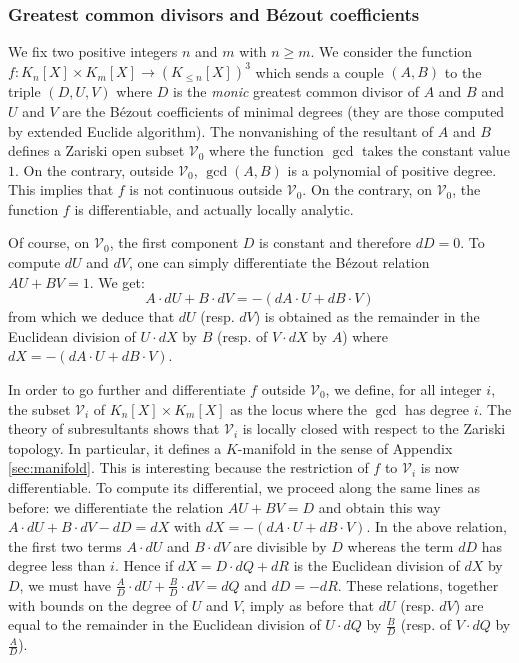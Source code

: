 \documentclass{lms}
\begin{document}
\subsubsection*{Greatest common divisors and B\'ezout coefficients}

We fix two positive integers $n$ and $m$ with $n \geq m$. We consider the 
function $f : K_n[X] \times K_m[X] \to (K_{\leq n}[X])^3$ which sends a 
couple $(A,B)$ to the triple $(D, U, V)$ where $D$ is the \emph{monic} 
greatest common divisor of $A$ and $B$ and $U$ and $V$ are the B\'ezout 
coefficients of minimal degrees (they are those computed by extended 
Euclide algorithm).
The nonvanishing of the resultant of $A$ and $B$ defines a Zariski open 
subset $\mathcal V_0$ where the function $\gcd$ takes the constant value 
$1$. On the contrary, outside $\mathcal V_0$, $\gcd(A,B)$ is a polynomial 
of positive degree. This implies that $f$ is not continuous outside 
$\mathcal V_0$. On the contrary, on $\mathcal V_0$, the function $f$ is
differentiable, and actually locally analytic.

Of course, on $\mathcal V_0$, the first component $D$ is constant and 
therefore $dD = 0$. To compute $dU$ and $dV$, one can simply 
differentiate the B\'ezout relation $AU + BV = 1$. We get:
$$A \cdot dU + B \cdot dV = - (dA \cdot U + dB \cdot V)$$
from which we deduce that $dU$ (resp. $dV$) is obtained as the 
remainder in the Euclidean division of $U{\cdot}dX$ by $B$ (resp. of 
$V{\cdot}dX$ by $A$) where $dX = - (dA \cdot U + dB \cdot V)$.

In order to go further and differentiate $f$ outside $\mathcal V_0$, we 
define, for all integer $i$, the subset $\mathcal V_i$ of $K_n[X] \times 
K_m[X]$ as the locus where the $\gcd$ has degree $i$. The theory of 
subresultants shows that $\mathcal V_i$ is locally closed with respect to 
the Zariski topology. In particular, it defines a $K$-manifold in the 
sense of Appendix \ref{sec:manifold}. This is interesting because the 
restriction of $f$ to $\mathcal V_i$ is now differentiable. To compute
its differential, we proceed along the same lines as before: we 
differentiate the relation $AU + BV = D$ and obtain this way
$A \cdot dU + B \cdot dV - dD = dX$
with $dX = - (dA \cdot U + dB \cdot V)$. In the above relation, the
first two terms $A{\cdot}dU$ and $B{\cdot}dV$ are divisible by $D$ 
whereas the term $dD$ has degree less than $i$. 
Hence if $dX = D \cdot dQ + dR$ is the Euclidean division of $dX$ by $D$, 
we must have $\frac A D \cdot dU + \frac B D \cdot dV = dQ$ and $dD = 
-dR$. These relations, together with bounds on the degree of $U$ and $V$,
imply as before that $dU$ (resp. $dV$) are equal to the remainder in the
Euclidean division of $U{\cdot}dQ$ by $\frac B D$ (resp. of $V{\cdot}dQ$
by $\frac A D$).
\end{document}
